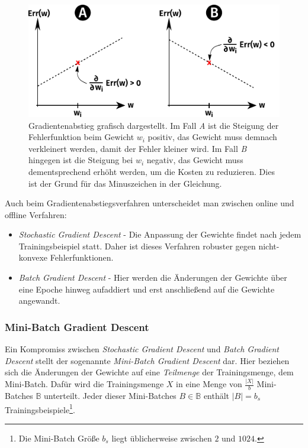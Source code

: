 \begin{figure}[ht!] \centering 
	\includegraphics[width=\linewidth]{figures/ch03_gradient-decent.pdf}
	\caption{Gradientenabstieg grafisch dargestellt. Im Fall \emph{A} ist die Steigung der Fehlerfunktion beim Gewicht $w_i$ positiv, das Gewicht muss demnach verkleinert werden, damit der Fehler kleiner wird. Im Fall \emph{B} hingegen ist die Steigung bei $w_i$ negativ, das Gewicht muss dementsprechend erhöht werden, um die Kosten zu reduzieren. Dies ist der Grund für das Minuszeichen in der Gleichung.}
	\label{fig:ch03_fehlerflaeche}
\end{figure}

Auch beim Gradientenabstiegsverfahren unterscheidet man zwischen online und offline Verfahren: 
\begin{itemize}
	\item \emph{Stochastic Gradient Descent} - Die Anpassung der Gewichte findet nach jedem Trainingsbeispiel statt. Daher ist dieses Verfahren robuster gegen nicht-konvexe Fehlerfunktionen. 
	\item \emph{Batch Gradient Descent} - Hier werden die Änderungen der Gewichte über eine Epoche hinweg aufaddiert und erst anschließend auf die Gewichte angewandt.
\end{itemize}

\subsubsection*{Mini-Batch Gradient Descent}
Ein Kompromiss zwischen \emph{Stochastic Gradient Descent} und \emph{Batch Gradient Descent} stellt der sogenannte \emph{Mini-Batch Gradient Descent} dar.
Hier beziehen sich die Änderungen der Gewichte auf eine \emph{Teilmenge} der Trainingsmenge, dem Mini-Batch. Dafür wird die Trainingsmenge $X$ in eine Menge von $\frac{|X|}{b}$ Mini-Batches $\mathbb{B}$ unterteilt. Jeder dieser Mini-Batches $B \in \mathbb{B}$ enthält $|B| = b_s$ Trainingsbeispiele\footnote{Die Mini-Batch Größe $b_s$ liegt üblicherweise zwischen $2$ und $1024$.}.


